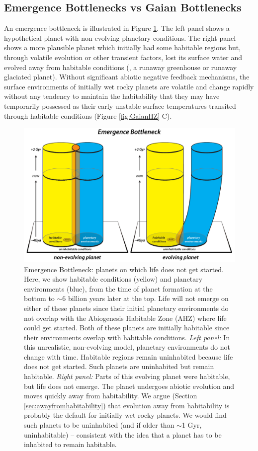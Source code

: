 \subsection{Emergence Bottlenecks vs Gaian Bottlenecks}
An emergence bottleneck is illustrated in Figure \ref{fig:EmergenceBottleneck}.
The left panel  shows a hypothetical planet with non-evolving planetary conditions.
The right panel shows a more plausible planet which initially had some habitable regions but, through volatile evolution or other
transient factors, lost its surface water and evolved away from habitable conditions (\eg, a runaway greenhouse or runaway glaciated planet).
Without significant abiotic negative feedback mechanisms, the surface environments of initially wet rocky planets are volatile and change rapidly
without any tendency to maintain the habitability that they may have temporarily possessed as their early unstable surface temperatures transited
through habitable conditions (Figure \ref{fig:GaianHZ} C).
\begin{figure}[!t]
	\centering
	\includegraphics[width=0.9\linewidth]{figures/EmergenceBottleneck.pdf}
	\caption[Emergence Bottleneck]{Emergence Bottleneck: planets on which life does not get started.
		Here, we show habitable conditions (yellow) and planetary environments (blue), from the time of planet formation at the bottom to $\sim$6 billion years later at the top.
		Life will not emerge on either of these planets since their initial planetary environments do not overlap with the Abiogenesis Habitable Zone (AHZ) where life could get started.
		Both of these planets are initially habitable since their environments overlap with habitable conditions. \textit{Left panel:} In this unrealistic, non-evolving model, planetary environments do not change with time. Habitable regions remain uninhabited because life does not get started. 
		Such planets are uninhabited but remain habitable. \textit{Right panel:}  Parts of this evolving planet were habitable, but life does not emerge. The planet undergoes abiotic evolution and moves quickly away from habitability.
		We argue (Section \ref{sec:awayfromhabitability}) that evolution away from habitability is probably the default for initially wet rocky planets.
		We would find such planets to be uninhabited (and if older than $\sim$1 Gyr, uninhabitable) -- consistent with the idea that a planet has to be inhabited to remain habitable.}
	\label{fig:EmergenceBottleneck}
\end{figure}
